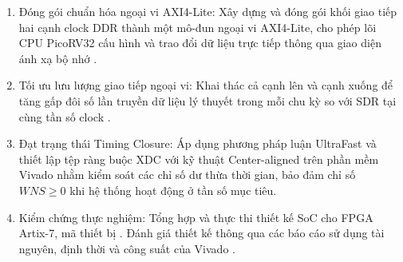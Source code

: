\begin{enumerate}
    \item {Đóng gói chuẩn hóa ngoại vi AXI4-Lite:} Xây dựng và đóng gói khối giao tiếp hai cạnh clock DDR thành một mô-đun ngoại vi AXI4-Lite, cho phép lõi CPU PicoRV32 cấu hình và trao đổi dữ liệu trực tiếp thông qua giao diện ánh xạ bộ nhớ \cite{picorv32_repo,arm_axi4_spec,jedec_ddr}.
    \item {Tối ưu lưu lượng giao tiếp ngoại vi:} Khai thác cả cạnh lên và cạnh xuống để tăng gấp đôi số lần truyền dữ liệu lý thuyết trong mỗi chu kỳ so với SDR tại cùng tần số clock \cite{jedec_ddr,psarras2017nocddr}.
    \item {Đạt trạng thái Timing Closure:} Áp dụng phương pháp luận UltraFast \cite{amd_ug949} và thiết lập tệp ràng buộc XDC \cite{amd_ug903} với kỹ thuật Center-aligned trên phần mềm Vivado \cite{amd_vivado_docs} nhằm kiểm soát các chỉ số dư thừa thời gian, bảo đảm chỉ số $WNS \ge 0$ khi hệ thống hoạt động ở tần số mục tiêu.
    \item {Kiểm chứng thực nghiệm:} Tổng hợp và thực thi thiết kế SoC cho FPGA Artix-7, mã thiết bị  \cite{amd_ds180,amd_ds181}. Đánh giá thiết kế thông qua các báo cáo sử dụng tài nguyên, định thời và công suất của Vivado \cite{amd_vivado_docs,amd_ug949}.
\end{enumerate}